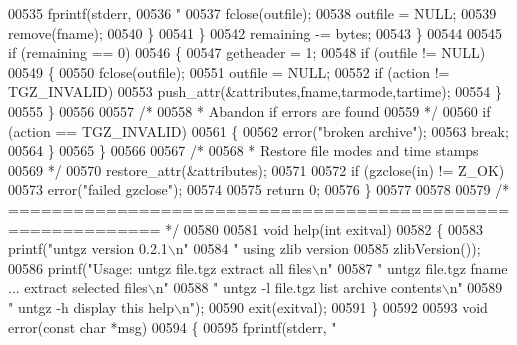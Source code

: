 \begin{DoxyCode}
{{{{{{{{{00535                   fprintf(stderr,
00536                     \textcolor{stringliteral}{"%
00537                   fclose(outfile);
00538                   outfile = NULL;
00539                   \textcolor{keyword}{remove}(fname);
00540                 \}
00541             \}
00542           remaining -= bytes;
00543         \}
00544 
00545       \textcolor{keywordflow}{if} (remaining == 0)
00546         \{
00547           getheader = 1;
00548           \textcolor{keywordflow}{if} (outfile != NULL)
00549             \{
00550               fclose(outfile);
00551               outfile = NULL;
00552               \textcolor{keywordflow}{if} (action != TGZ\_INVALID)
00553                 push\_attr(&attributes,fname,tarmode,tartime);
00554             \}
00555         \}
00556 
00557       \textcolor{comment}{/*}
00558 \textcolor{comment}{       * Abandon if errors are found}
00559 \textcolor{comment}{       */}
00560       \textcolor{keywordflow}{if} (action == TGZ\_INVALID)
00561         \{
00562           error(\textcolor{stringliteral}{"broken archive"});
00563           \textcolor{keywordflow}{break};
00564         \}
00565     \}
00566 
00567   \textcolor{comment}{/*}
00568 \textcolor{comment}{   * Restore file modes and time stamps}
00569 \textcolor{comment}{   */}
00570   restore\_attr(&attributes);
00571 
00572   \textcolor{keywordflow}{if} (gzclose(in) != Z\_OK)
00573     error(\textcolor{stringliteral}{"failed gzclose"});
00574 
00575   \textcolor{keywordflow}{return} 0;
00576 \}
00577 
00578 
00579 \textcolor{comment}{/* ============================================================ */}
00580 
00581 \textcolor{keywordtype}{void} help(\textcolor{keywordtype}{int} exitval)
00582 \{
00583   printf(\textcolor{stringliteral}{"untgz version 0.2.1\(\backslash\)n"}
00584          \textcolor{stringliteral}{"  using zlib version %
00585          zlibVersion());
00586   printf(\textcolor{stringliteral}{"Usage: untgz file.tgz            extract all files\(\backslash\)n"}
00587          \textcolor{stringliteral}{"       untgz file.tgz fname ...  extract selected files\(\backslash\)n"}
00588          \textcolor{stringliteral}{"       untgz -l file.tgz         list archive contents\(\backslash\)n"}
00589          \textcolor{stringliteral}{"       untgz -h                  display this help\(\backslash\)n"});
00590   exit(exitval);
00591 \}
00592 
00593 \textcolor{keywordtype}{void} error(\textcolor{keyword}{const} \textcolor{keywordtype}{char} *msg)
00594 \{
00595   fprintf(stderr, \textcolor{stringliteral}{"%
}}}}}}}}}}}}
\end{DoxyCode}
